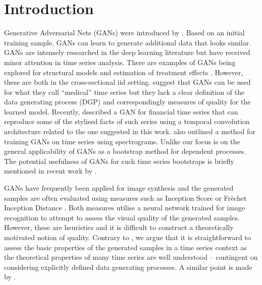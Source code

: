 \documentclass[12pt]{article}
\begin{document}
\section{Introduction}
Generative Adversarial Nets (GANs) were introduced by \citet{goodfellow2014generative}. Based on an initial training sample, GANs can learn to generate additional data that looks similar. GANs are intensely researched in the deep learning literature \citep{radford2015unsupervised,salimans2016inceptionscore,gulrajani2017improved,arjovsky2017wasserstein} but have received minor attention in time series analysis. There are examples of GANs being explored for structural models \citep{kaji2018deepinf} and estimation of treatment effects \citep{athey2019using}. However, these are both in the cross-sectional iid setting. \citet{esteban2017real} suggest that GANs can be used for what they call ``medical'' time series but they lack a clear definition of the data generating process (DGP) and correspondingly measures of quality for the learned model. Recently, \citet{wiese2020quantgan} described a GAN for financial time series that can reproduce some of the stylised facts of such series using a temporal convolution architecture related to the one suggested in this work. \citet{smith2020conditional} also outlined a method for training GANs on time series using spectrograms. Unlike \citet{wiese2020quantgan,smith2020conditional} our focus is on the general applicability of GANs as a bootstrap method for dependent processes. The potential usefulness of GANs for such time series bootstraps is briefly mentioned in recent work by \citet{haas2020statistical}.

GANs have frequently been applied for image synthesis \citep{goodfellow2014generative,radford2015unsupervised,arjovsky2017wasserstein} and the generated samples are often evaluated using measures such as Inception Score \citep{salimans2016inceptionscore} or Frèchet Inception Distance \citep{heusel2017fid}. Both measures utilise a neural network trained for image recognition to attempt to assess the visual quality of the generated samples. However, these are heuristics and it is difficult to construct a theoretically motivated notion of quality. Contrary to \citet{esteban2017real}, we argue that it is straightforward to assess the basic properties of the generated samples in a time series context as the theoretical properties of many time series are well understood -- contingent on considering explicitly defined data generating processes. A similar point is made by \citet{wiese2020quantgan}. 
\end{document}
